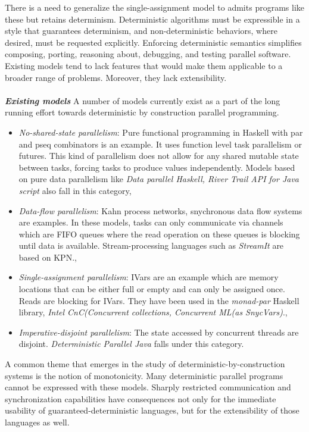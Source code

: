 \documentclass[twocolumn]{article}
\begin{document}
There is a need to generalize the single-assignment model to admits programs like these but retains determinism. Deterministic algorithms must be expressible in a style that guarantees determinism, and non-deterministic behaviors, where desired, must be requested explicitly. Enforcing deterministic semantics simplifies composing, porting, reasoning about, debugging, and testing parallel software. Existing models tend to lack features that would make them applicable to a broader range of problems. Moreover, they lack extensibility. \\ \\
\textit{\textbf{Existing models}}\cite{kuper} A number of models currently exist as a part of the long running effort towards deterministic by construction parallel programming. \par
\begin{itemize}
        \item \textit{No-shared-state parallelism}: Pure functional programming in Haskell with par and pseq combinators is an example. It uses function level task parallelism or futures. This kind of parallelism does not allow for any shared mutable state between tasks, forcing tasks to produce values independently. Models based on pure data parallelism like \textit{Data parallel Haskell, River Trail API for Java script} also fall in this category,
        \item \textit{Data-flow parallelism}: Kahn process networks, snychronous data flow systems are examples. In these models, tasks can only communicate via channels which are FIFO queues where the read operation on these queues is blocking until data is available. Stream-processing languages such as \textit{StreamIt} are based on KPN., 
        \item \textit{Single-assignment parallelism}: IVars are an example which are memory locations that can be either full or empty and can only be assigned once. Reads are blocking for IVars. They have been used in the \textit{monad-par} Haskell library, \textit{Intel CnC(Concurrent collections, Concurrent ML(as SnycVars)}.,
        \item \textit{Imperative-disjoint parallelism}: The state accessed by concurrent threads are disjoint. \textit{Deterministic Parallel Java} falls under this category.     
\end{itemize} 
A common theme that emerges in the study of deterministic-by-construction systems is the notion of monotonicity. Many deterministic parallel programs cannot be expressed with these models. Sharply restricted communication and synchronization capabilities have consequences not only for the immediate usability of guaranteed-deterministic languages, but for the extensibility of those languages as well.
\end{document}
